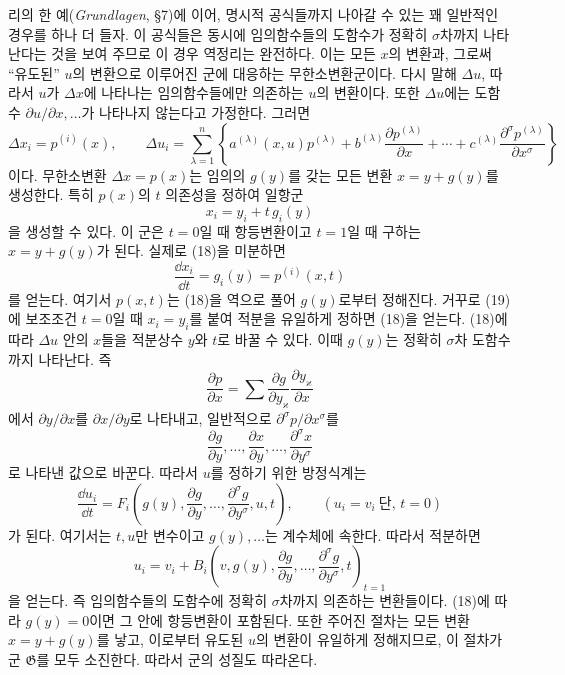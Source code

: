 리의 한 예(\emph{Grundlagen}, \S{}7)에 이어, 명시적 공식들까지 나아갈 수 있는 꽤 일반적인 경우를 하나 더 들자. 이 공식들은 동시에 임의함수들의 도함수가 정확히 \(\sigma\)차까지 나타난다는 것을 보여 주므로 이 경우 역정리는 완전하다. 이는 모든 \(x\)의 변환과, 그로써 ``유도된'' \(u\)의 변환으로 이루어진 군에 대응하는 무한소변환군이다. 다시 말해 \(\Delta u\), 따라서 \(u\)가 \(\Delta x\)에 나타나는 임의함수들에만 의존하는 \(u\)의 변환이다. 또한 \(\Delta u\)에는 도함수 \(\partial u/\partial x,\ldots\)가 나타나지 않는다고 가정한다. 그러면
\[
\Delta x_i=p^{(i)}(x),\qquad
\Delta u_i=
\sum_{\lambda=1}^{n}\left\{
a^{(\lambda)}(x,u)p^{(\lambda)}
+b^{(\lambda)}\frac{\partial p^{(\lambda)}}{\partial x}
+\cdots+c^{(\lambda)}
\frac{\partial^\sigma p^{(\lambda)}}{\partial x^\sigma}
\right\}
\]
이다. 무한소변환 \(\Delta x=p(x)\)는 임의의 \(g(y)\)를 갖는 모든 변환 \(x=y+g(y)\)를 생성한다. 특히 \(p(x)\)의 \(t\) 의존성을 정하여 일항군
\begin{equation}
\tag{18}
x_i=y_i+t\,g_i(y)
\end{equation}
을 생성할 수 있다. 이 군은 \(t=0\)일 때 항등변환이고 \(t=1\)일 때 구하는 \(x=y+g(y)\)가 된다. 실제로 (18)을 미분하면
\begin{equation}
\tag{19}
\frac{\dd x_i}{\dd t}=g_i(y)=p^{(i)}(x,t)
\end{equation}
를 얻는다. 여기서 \(p(x,t)\)는 (18)을 역으로 풀어 \(g(y)\)로부터 정해진다. 거꾸로 (19)에 보조조건 \(t=0\)일 때 \(x_i=y_i\)를 붙여 적분을 유일하게 정하면 (18)을 얻는다. (18)에 따라 \(\Delta u\) 안의 \(x\)들을 적분상수 \(y\)와 \(t\)로 바꿀 수 있다. 이때 \(g(y)\)는 정확히 \(\sigma\)차 도함수까지 나타난다. 즉
\[
\frac{\partial p}{\partial x}
=\sum\frac{\partial g}{\partial y_\varkappa}
\frac{\partial y_\varkappa}{\partial x}
\]
에서 \(\partial y/\partial x\)를 \(\partial x/\partial y\)로 나타내고, 일반적으로 \(\partial^\sigma p/\partial x^\sigma\)를
\[
\frac{\partial g}{\partial y},\ldots,
\frac{\partial x}{\partial y},\ldots,
\frac{\partial^\sigma x}{\partial y^\sigma}
\]
로 나타낸 값으로 바꾼다. 따라서 \(u\)를 정하기 위한 방정식계는
\[
\frac{\dd u_i}{\dd t}
=F_i\!\left(g(y),\frac{\partial g}{\partial y},\ldots,
\frac{\partial^\sigma g}{\partial y^\sigma},u,t\right),
\qquad(u_i=v_i\ \text{단, }t=0)
\]
가 된다. 여기서는 \(t,u\)만 변수이고 \(g(y),\ldots\)는 계수체에 속한다. 따라서 적분하면
\[
u_i=v_i+B_i\!\left(v,g(y),\frac{\partial g}{\partial y},\ldots,
\frac{\partial^\sigma g}{\partial y^\sigma},t\right)_{t=1}
\]
을 얻는다. 즉 임의함수들의 도함수에 정확히 \(\sigma\)차까지 의존하는 변환들이다. (18)에 따라 \(g(y)=0\)이면 그 안에 항등변환이 포함된다. 또한 주어진 절차는 모든 변환 \(x=y+g(y)\)를 낳고, 이로부터 유도된 \(u\)의 변환이 유일하게 정해지므로, 이 절차가 군 \(\mathfrak G\)를 모두 소진한다. 따라서 군의 성질도 따라온다.

